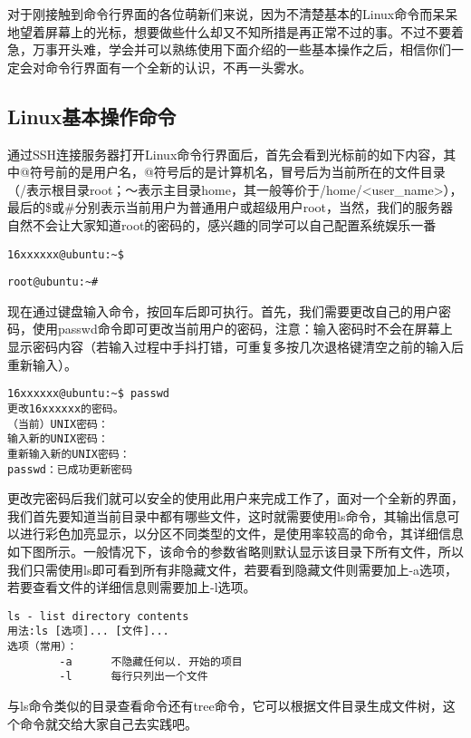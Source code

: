 对于刚接触到命令行界面的各位萌新们来说，因为不清楚基本的Linux命令而呆呆地望着屏幕上的光标，想要做些什么却又不知所措是再正常不过的事。不过不要着急，万事开头难，学会并可以熟练使用下面介绍的一些基本操作之后，相信你们一定会对命令行界面有一个全新的认识，不再一头雾水。

\subsection{Linux基本操作命令}
通过SSH连接服务器打开Linux命令行界面后，首先会看到光标前的如下内容，其中@符号前的是用户名，@符号后的是计算机名，冒号后为当前所在的文件目录（/表示根目录root；～表示主目录home，其一般等价于/home/<user\_name>），最后的\$或\#分别表示当前用户为普通用户或超级用户root，当然，我们的服务器自然不会让大家知道root的密码的，感兴趣的同学可以自己配置系统娱乐一番

\begin{verbatim}
16xxxxxx@ubuntu:~$
\end{verbatim}
\begin{verbatim}
root@ubuntu:~#
\end{verbatim}

现在通过键盘输入命令，按回车后即可执行。首先，我们需要更改自己的用户密码，使用passwd命令即可更改当前用户的密码，注意：输入密码时不会在屏幕上显示密码内容（若输入过程中手抖打错，可重复多按几次退格键清空之前的输入后重新输入）。

\begin{verbatim}
16xxxxxx@ubuntu:~$ passwd
更改16xxxxxx的密码。
（当前）UNIX密码：
输入新的UNIX密码：
重新输入新的UNIX密码：
passwd：已成功更新密码
\end{verbatim}

更改完密码后我们就可以安全的使用此用户来完成工作了，面对一个全新的界面，我们首先要知道当前目录中都有哪些文件，这时就需要使用ls命令，其输出信息可以进行彩色加亮显示，以分区不同类型的文件，是使用率较高的命令，其详细信息如下图所示。一般情况下，该命令的参数省略则默认显示该目录下所有文件，所以我们只需使用ls即可看到所有非隐藏文件，若要看到隐藏文件则需要加上-a选项，若要查看文件的详细信息则需要加上-l选项。

\begin{verbatim}
ls - list directory contents
用法:ls [选项]... [文件]...
选项（常用）：
		-a		不隐藏任何以. 开始的项目
		-l		每行只列出一个文件
\end{verbatim}

\begin{note}
与ls命令类似的目录查看命令还有tree命令，它可以根据文件目录生成文件树，这个命令就交给大家自己去实践吧。
\end{note}

